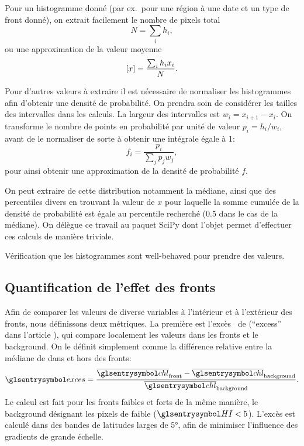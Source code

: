 \documentclass[index]{subfiles}
\begin{document}
Pour un histogramme donné (par ex.\ pour une région à une date et un type de front donné), on extrait facilement le nombre de pixels total
\begin{equation}
  N = \sum_i h_i,
\end{equation}
ou une approximation de la valeur moyenne
\begin{equation}
  \left[x\right] = \frac{\sum_i h_i x_i} {N}.
\end{equation}

Pour d'autres valeurs à extraire il est nécessaire de normaliser les histogrammes afin d'obtenir une densité de probabilité. On prendra soin de considérer les tailles des intervalles dans les calculs.
La largeur des intervalles est \(w_i = x_{i+1}-x_i\). On transforme le nombre de points en probabilité par unité de valeur \(p_i = h_i / w_i \), avant de le normaliser de sorte à obtenir une intégrale égale à 1:
\begin{equation}
  f_i = \frac{p_i} {\sum_j p_j w_j},
\end{equation}
pour ainsi obtenir une approximation de la densité de probabilité \(f\).

On peut extraire de cette distribution notamment la médiane, ainsi que des percentiles divers en trouvant la valeur de \(x\) pour laquelle la somme cumulée de la densité de probabilité est égale au percentile recherché (0.5 dans le cas de la médiane).
On délègue ce travail au paquet SciPy dont l'objet  permet d'effectuer ces calculs de manière triviale.

Vérification que les histogrammes sont well-behaved pour prendre des valeurs.

\subsection{Quantification de l'effet des fronts}
\label{sec:extraction-surplus}

Afin de comparer les valeurs de diverse variables à l'intérieur et à l'extérieur des fronts, nous définissons deux métriques.
La première est l'excès~ de  (\enquote{excess} dans l'article ), qui compare localement les valeurs dans les fronts et le background. On le définit simplement comme la différence relative entre la médiane de  dans et hors des fronts:
\begin{equation}
  \am{exces} = \frac{\med{\am{chl}}_\frt - \med{\am{chl}}_\bkg}
  {\med{\am{chl}}_\bkg} .
\end{equation}
Le calcul est fait pour les fronts faibles et forts de la même manière, le background désignant les pixels de  faible (\(\am{HI} < 5\)).
L'excès est calculé dans des bandes de latitudes larges de \ang{5}, afin de minimiser l'influence des gradients de grande échelle.
\end{document}
